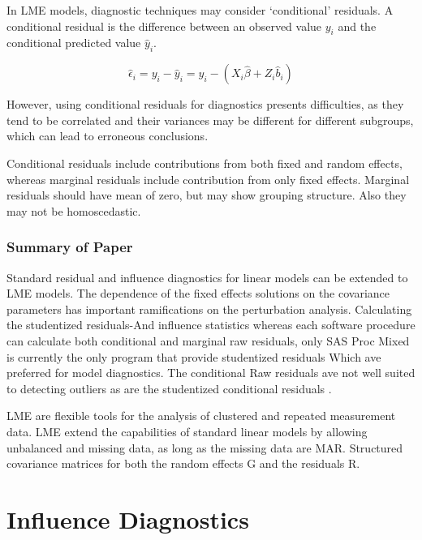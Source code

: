 \documentclass[12pt, a4paper]{report}
\theoremstyle{plain}
\theoremstyle{definition}
\theoremstyle{remark}
\begin{document}
%
	
In LME models, diagnostic techniques may consider `conditional' residuals. A conditional residual is the difference between an observed value $y_{i}$ and the conditional predicted value $\hat{y}_{i} $.
	
	\[ \hat{\epsilon}_{i} = y_{i} - \hat{y}_{i} = y_{i} - ( X_{i}\hat{\beta} + Z_{i}\hat{b}_{i}) \]
	
However, using conditional residuals for diagnostics presents difficulties, as they tend to be correlated and their variances may be different for different subgroups, which can lead to erroneous conclusions.
	


Conditional residuals include contributions from both fixed and random effects, whereas marginal residuals include contribution from only fixed effects. Marginal residuals should have mean of zero, but may show grouping structure. Also they may not be homoscedastic.

\subsubsection{Summary of Paper}
Standard residual and influence diagnostics for linear models can be extended to LME models. The dependence of the fixed effects solutions on the covariance parameters has important ramifications on the perturbation analysis. Calculating the studentized residuals-And influence statistics whereas each software procedure can calculate both conditional and marginal raw residuals, only SAS Proc Mixed is currently the only program that provide studentized residuals Which ave preferred for model diagnostics. The conditional Raw residuals ave not well suited to detecting outliers as are the studentized conditional residuals \citep{schabenberger}.

LME are flexible tools for the analysis of clustered and repeated measurement data. LME extend the capabilities of standard linear models by allowing unbalanced and missing data, as long as the missing data are MAR. Structured covariance matrices for both the random effects G and the residuals R. 


\section{Influence Diagnostics}
\end{document}
